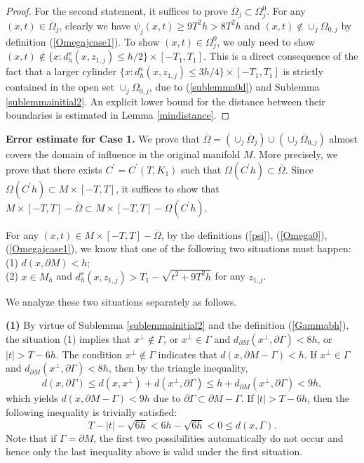 \documentclass[11pt,letterpaper]{amsart}
\numberwithin{equation}{section}
\theoremstyle{definition}
\theoremstyle{plain}
\theoremstyle{definition}
\theoremstyle{plain}
\theoremstyle{definition}
\theoremstyle{plain}
\begin{document}
\begin{proof}
For the second statement, it suffices to prove $\overline{\Omega}_j \subset \Omega_j^0$. For any $(x,t)\in \overline{\Omega}_j$, clearly we have $\psi_j(x,t)\geqslant 9T^2 h>8T^2h$ and $(x,t)\notin \cup_{j}\Omega_{0,j}$ by definition (\ref{Omegajcase1}). To show $(x,t)\in \Omega_j^0$, we only need to show $(x,t)\notin \{x:d_h^s(x,z_{1,j})\leqslant h/2\}\times [-T_1,T_1]$. This is a direct consequence of the fact that a larger cylinder $\{x:d_h^s(x,z_{1,j})\leqslant 3h/4\}\times [-T_1,T_1]$ is strictly contained in the open set $\cup_{j}\Omega_{0,j}$, due to (\ref{sublemma0d}) and Sublemma \ref{sublemmainitial2}. An explicit lower bound for the distance between their boundaries is estimated in Lemma \ref{mindistance}.
\end{proof}

\smallskip
\noindent\textbf{Error estimate for Case 1.} We prove that $\overline{\Omega}=(\cup_j \overline{\Omega}_j) \cup (\cup_j\overline{\Omega}_{0,j})$ almost covers the domain of influence in the original manifold $M$. More precisely, we prove that there exists $C^{\prime}=C^{\prime}(T,K_1)$ such that $\Omega(C^{\prime}h)\subset \overline{\Omega}$. Since $\Omega(C^{\prime}h)\subset M\times [-T,T]$, it suffices to show that $M\times [-T,T]-\overline{\Omega}\subset M\times [-T,T]-\Omega(C^{\prime}h)$.

For any $(x,t)\in M\times [-T,T]-\overline{\Omega}$, by the definitions (\ref{psi}), (\ref{Omega0}), (\ref{Omegajcase1}), we know that one of the following two situations must happen:\\
(1) $d(x, \partial M)< h$; \\
(2) $x\in M_h$ and $d_h^s(x,z_{1,j})> T_1-\sqrt{t^2+9T^2 h}$ for any $z_{1,j}$. 

\smallskip
We analyze these two situations separately as follows.

\noindent \textbf{(1)} By virtue of Sublemma \ref{sublemmainitial2} and the definition (\ref{Gammabh}), the situation (1) implies that $x^{\perp}\notin \Gamma$, or $x^{\perp}\in \Gamma$ and $d_{\partial M}(x^{\perp},\partial \Gamma)<8h$, or $|t|> T-6h$. The condition $x^{\perp}\notin \Gamma$ indicates that $d(x,\partial M-\Gamma)<h$. If $x^{\perp}\in \Gamma$ and $d_{\partial M}(x^{\perp},\partial \Gamma)<8h$, then by the triangle inequality,
$$d(x,\partial\Gamma)\leqslant d(x,x^{\perp})+d(x^{\perp},\partial \Gamma)\leqslant h+d_{\partial M}(x^{\perp},\partial \Gamma)<9h,$$
which yields $d(x,\partial M-\Gamma)<9h$ due to $\partial \Gamma\subset \partial M-\Gamma$. If $|t|>T-6h$, then the following inequality is trivially satisfied:
$$T-|t|-\sqrt{6h}<6h-\sqrt{6h}<0\leqslant d(x,\Gamma).$$
Note that if $\Gamma=\partial M$, the first two possibilities automatically do not occur and hence only the last inequality above is valid under the first situation.
\end{document}
